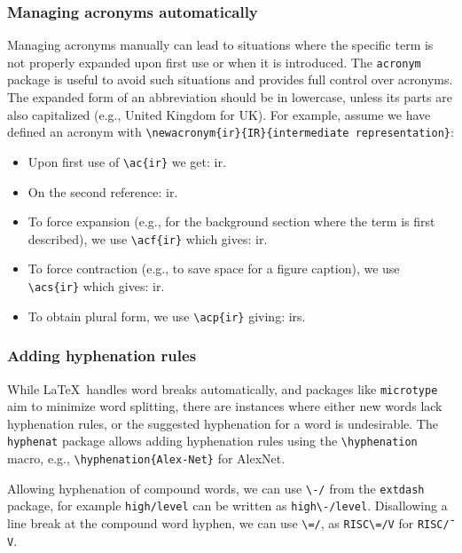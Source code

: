 \documentclass[review, anonymous, acmsmall, screen]{acmart}
\newenvironment{draftonly}{}{}
\begin{document}
\begin{draftonly}
\subsubsection{Managing acronyms automatically}
Managing acronyms manually can lead to situations where the specific term is not properly expanded upon first use or when it is introduced.
The \texttt{acronym} package is useful to avoid such situations and provides full control over acronyms.
The expanded form of an abbreviation should be in lowercase, unless its parts are also capitalized (e.g., United Kingdom for UK).
For example, assume we have defined an acronym with \texttt{\textbackslash{}newacronym\{ir\}\{IR\}\{intermediate representation\}}:
\begin{itemize}
  \item Upon first use of \texttt{\textbackslash{}ac\{ir\}} we get: \ac{ir}.
  \item On the second reference: \ac{ir}.
  \item To force expansion (e.g., for the background section where the term is first described), we use \texttt{\textbackslash{}acf\{ir\}} which gives: \acf{ir}.
  \item To force contraction (e.g., to save space for a figure caption), we use \texttt{\textbackslash{}acs\{ir\}} which gives: \acs{ir}.
  \item To obtain plural form, we use \texttt{\textbackslash{}acp\{ir\}} giving: \acp{ir}.
\end{itemize}

\subsubsection{Adding hyphenation rules}
While \LaTeX\ handles word breaks automatically, and packages like \texttt{microtype} aim to minimize word splitting, there are instances where either new words lack hyphenation rules, or the suggested hyphenation for a word is undesirable.
The \texttt{hyphenat} package allows adding hyphenation rules using the \texttt{\textbackslash{}hyphenation} macro, e.g., \texttt{\textbackslash{}hyphenation\{Alex-Net\}} for AlexNet.

Allowing hyphenation of compound words, we can use \texttt{\textbackslash{}-/} from the \texttt{extdash} package, for example \texttt{high\-/level} can be written as \texttt{high\textbackslash{}-/level}.
Disallowing a line break at the compound word hyphen, we can use \texttt{\textbackslash{}=/}, as \texttt{RISC\textbackslash{}=/V} for \texttt{RISC\=/V}.

\end{draftonly}
\end{document}
